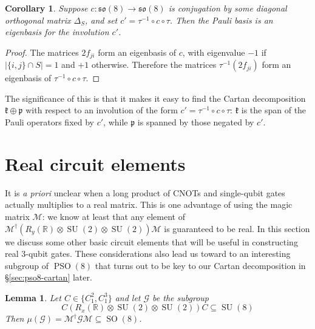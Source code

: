 \documentclass[reqno]{amsart}
\newtheorem{lemma}[theorem]{Lemma}
\newtheorem{corollary}[theorem]{Corollary}
\theoremstyle{definition} \newtheorem{example}[theorem]{Example}
\newcommand{\RR}{\mathbb{R}}
\newcommand{\SU}{\operatorname{SU}}
\newcommand{\SO}{\operatorname{SO}}
\newcommand{\PSO}{\operatorname{PSO}}
\newcommand{\so}{\mathfrak{so}}
\newcommand{\secsymbol}{§}
\newcommand{\p}{\mathfrak{p}}
\newcommand{\G}{\mathcal{G}}
\renewcommand{\k}{\mathfrak{k}}
\newcommand{\M}{\mathcal{M}}
\begin{document}
\begin{corollary}  \label{cor:pauli}
Suppose $c : \so(8) \to \so(8)$ is conjugation by some diagonal orthogonal matrix $\Delta_S$, and set $c' = \tau^{-1} \circ c \circ \tau$. Then the Pauli basis is an eigenbasis for the involution $c'$. 
\end{corollary}

\begin{proof}
The matrices $2f_{ji}$ form an eigenbasis of $c$, with eigenvalue $-1$ if $|\{i,j\} \cap S| = 1$ and $+1$ otherwise. Therefore the matrices $\tau^{-1}(2f_{ji})$ form an eigenbasis of $\tau^{-1} \circ c \circ \tau$.
\end{proof}

The significance of this is that it makes it easy to find the Cartan decomposition $\k \oplus \p$ with respect to an involution of the form $c' = \tau^{-1} \circ c \circ \tau$: $\k$ is the span of the Pauli operators fixed by $c'$, while $\p$ is spanned by those negated by $c'$.


\section{Real circuit elements} \label{sec:real-circuits}
It is \emph{a priori} unclear when a long product of CNOTs and single-qubit gates actually multiplies to a real matrix. This is one advantage of using the magic matrix $\M$: we know at least that any element of $\M^\dagger (R_y(\RR) \otimes \SU(2) \otimes \SU(2))\M$ is guaranteed to be real. In this section we discuss some other basic circuit elements that will be useful in constructing real 3-qubit gates. These considerations also lead us toward to an interesting subgroup of $\PSO(8)$ that turns out to be key to our Cartan decomposition in \secsymbol\ref{sec:pso8-cartan} later.

\begin{lemma} \label{lem:real-gates-rx}
Let $C \in \{C_1^2, C_1^3\}$ and let $\G$ be the subgroup
\begin{equation*}
C(R_x(\RR) \otimes \SU(2) \otimes \SU(2))C \subseteq \SU(8)
\end{equation*}
Then $\mu(\G) = \M^\dagger \G \M \subseteq \SO(8)$.
\end{lemma}
\end{document}
